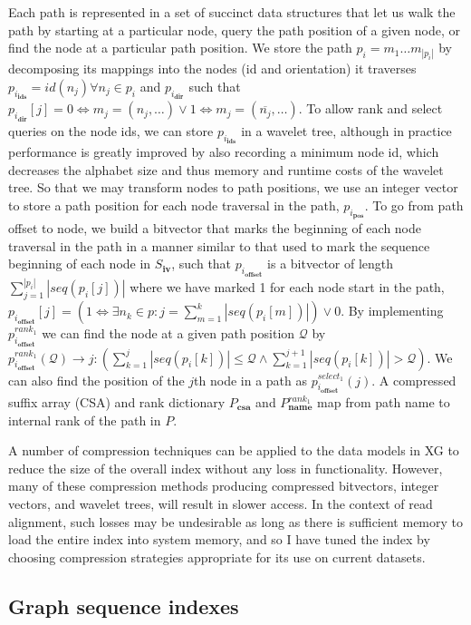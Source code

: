 \documentclass[a4paper,12pt,numbered,oneside]{Classes/PhDThesisPSnPDF}
\providecommand{\DIFaddbegin}{} %
\begin{document}
Each path is represented in a set of succinct data structures that let us walk the path by starting at a particular node, query the path position of a given node, or find the node at a particular path position.
We store the path $p_i = m_1 \ldots m_{|p_i|}$ by decomposing its mappings into the nodes (id and orientation) it traverses $p_{i_\textbf{ids}} = id(n_j) \forall n_j \in p_i$ and $p_{i_\textbf{dir}}$ such that $p_{i_\textbf{dir}}[j] = 0 \iff m_j = (n_j, \ldots) \lor 1 \iff m_j = (\overline{n_j}, \ldots)$.
To allow rank and select queries on the node ids, we can store $p_{i_\textbf{ids}}$ in a wavelet tree, although in practice performance is greatly improved by also recording a minimum node id, which decreases the alphabet size and thus memory and runtime costs of the wavelet tree.
So that we may transform nodes to path positions, we use an integer vector to store a path position for each node traversal in the path, $p_{i_\textbf{pos}}$.
To go from path offset to node, we build a bitvector that marks the beginning of each node traversal in the path in a manner similar to that used to mark the sequence beginning of each node in $S_\textbf{iv}$, such that $p_{i_\textbf{offset}}$ is a bitvector of length $\sum_{j=1}^{|p_i|} |seq(p_i[j])|$ where we have marked 1 for each node start in the path, $p_{i_\textbf{offset}}[j] = \left( 1 \iff \exists n_k \in p : j = \sum_{m=1}^{k} |seq(p_i[m])| \right) \lor 0$.
By implementing $p_{i_\textbf{offset}}^{rank_1}$ we can find the node at a given path position $\mathcal{Q}$ by $p_{i_\textbf{offset}}^{rank_1}(\mathcal{Q}) \to j : \left( \sum_{k=1}^{j} |seq(p_i[k])| \leq \mathcal{Q} \land \sum_{k=1}^{j+1} |seq(p_i[k])| > \mathcal{Q} \right)$.
We can also find the position of the $j$th node in a path as $p_{i_\textbf{offset}}^{select_1}(j)$.
A compressed suffix array (CSA) and rank dictionary $P_\textbf{csa}$ and $P_\textbf{name}^{rank_1}$ map from path name to internal rank of the path in $P$.

A number of compression techniques can be applied to the data models in XG to reduce the size of the overall index without any loss in functionality.
However, many of these compression methods producing compressed bitvectors, integer vectors, and wavelet trees, will result in slower access.
In the context of read alignment, such losses may be undesirable as long as there is sufficient memory to load the entire index into system memory, and so I have tuned the index by choosing compression strategies appropriate for its use on current datasets.

\subsection{Graph sequence indexes}
\label{sec:graph_sequence_indexes}
\DIFaddbegin 
\end{document}
